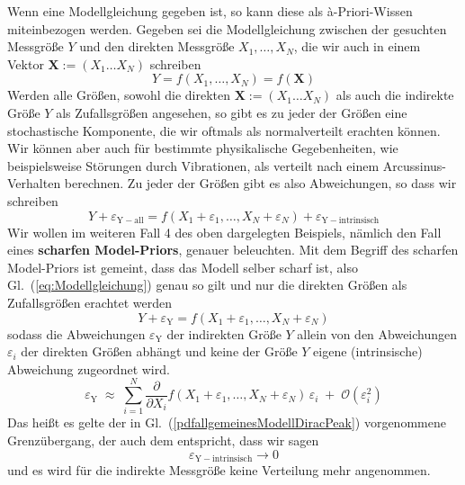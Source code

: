 Wenn eine Modellgleichung gegeben ist, so kann diese als {\`a}-Priori-Wissen miteinbezogen werden.
Gegeben sei die Modellgleichung zwischen der gesuchten
Messgröße $Y$ und den direkten Messgröße $X_1,\ldots, X_N$, die wir auch in einem
Vektor $\boldsymbol{X} := (X_1 \ldots  X_N)$ schreiben
\begin{equation}
Y = f(X_1,\ldots,X_N) = f(\boldsymbol{X})
\label{eq:Modellgleichung}
\end{equation}
Werden alle Größen, sowohl die direkten $\boldsymbol{X} := (X_1 \ldots  X_N)$ als
auch die indirekte Größe $Y$ als Zufallsgrößen angesehen, so gibt es zu jeder der
Größen eine stochastische Komponente, die wir oftmals als normalverteilt erachten können.
Wir können aber auch für bestimmte physikalische Gegebenheiten, wie beispielsweise Störungen
durch Vibrationen, als verteilt nach einem Arcussinus-Verhalten berechnen.
Zu jeder der Größen gibt es also Abweichungen, so dass wir schreiben
\begin{equation}
Y + \varepsilon_\mathrm{Y-all} = f(X_1 + \varepsilon_1,\ldots,X_N + \varepsilon_N) + \varepsilon_\mathrm{Y-intrinsisch}
\label{eq:ModellgleichungAlleZufall}
\end{equation}
Wir wollen im weiteren Fall 4 des oben dargelegten Beispiels, nämlich den Fall eines
\textbf{scharfen Model-Priors}, genauer beleuchten. Mit dem Begriff des scharfen
Model-Priors ist gemeint, dass das Modell
selber scharf ist, also Gl.~(\ref{eq:Modellgleichung}) genau so gilt und nur die direkten
Größen als Zufallsgrößen erachtet werden
\begin{equation}
Y + \varepsilon_\mathrm{Y} = f(X_1 + \varepsilon_1,\ldots,X_N + \varepsilon_N)
\label{eq:ModellgleichungDirekteZufall}
\end{equation}
sodass die Abweichungen $\varepsilon_\mathrm{Y}$ der indirekten Größe $Y$ allein von
den Abweichungen $\varepsilon_i$ der direkten Größen abhängt und keine der Größe
$Y$ eigene (intrinsische) Abweichung zugeordnet wird.
\begin{equation}
\varepsilon_\mathrm{Y} \; \approx \;
\sum\limits_{i=1}^N \frac{\partial}{\partial X_i} f(X_1 + \varepsilon_1,\ldots,X_N + \varepsilon_N)
\, \varepsilon_i \; + \; \mathcal{O}(\varepsilon_i^2)
\label{eq:epsilonY}
\end{equation}
Das heißt es gelte der in Gl.~(\ref{pdfallgemeinesModellDiracPeak}) vorgenommene
Grenzübergang, der auch dem entspricht, dass wir sagen
$$
\varepsilon_\mathrm{Y-intrinsisch} \rightarrow 0
$$
und es wird für die indirekte Messgröße keine Verteilung mehr angenommen.
